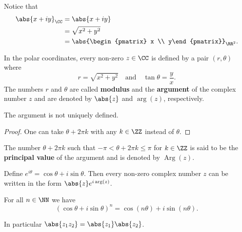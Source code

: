 \documentclass[12pt, a4paper]{article}
\DeclareMathOperator{\Arg}{Arg}
\begin{document}
\begin{mdremark}
    Notice that 
    \[\begin{aligned}
        \abs{x+iy}_{\CC} &= \abs{x+iy} \\
        &= \sqrt{x^2+y^2} \\
        &= \abs{\begin{pmatrix} x \\ y\end{pmatrix}}_{\RR^2}.
    \end{aligned}\]
\end{mdremark}

\begin{definition}
    In the polar coordinates, every non-zero \(z \in \CC\) is defined by a pair \((r,\theta)\) where 
    \[r = \sqrt{x^2+y^2} \quad \text{and} \quad \tan\theta = \frac{y}{x}.\]
    The numbers \(r\) and \(\theta\) are called \textbf{modulus} and the \textbf{argument} of the complex number \(z\) and are denoted by \(\abs{z}\) and \(\arg(z)\), respectively.
\end{definition}

\begin{theorem}
    The argument is not uniquely defined.
\end{theorem}

\begin{proof}
    One can take \(\theta+2 \pi k\) with any \(k \in \ZZ\) instead of \(\theta\).
\end{proof}

\begin{definition}
    The number \(\theta +2 \pi k\) such that \(-\pi < \theta + 2 \pi k \leq \pi\) for \(k \in \ZZ\) is said to be the \textbf{principal value} of the argument and is denoted by \(\Arg(z)\).
\end{definition}

\begin{theorem}
    Define \(e^{i\theta} = \cos\theta +i\sin\theta\). Then every non-zero complex number \(z\) can be written in the form \(\abs{z} e^{i \arg(z)}\).
\end{theorem}

\begin{mdthm}
    For all \(n \in \NN\) we have 
    \[(\cos\theta+i\sin\theta)^n = \cos(n\theta)+i\sin(n\theta).\]
\end{mdthm}

\begin{corollary}
    In particular \(\abs{z_1 z_2} = \abs{z_1} \abs{z_2}\).
\end{corollary}
\end{document}
